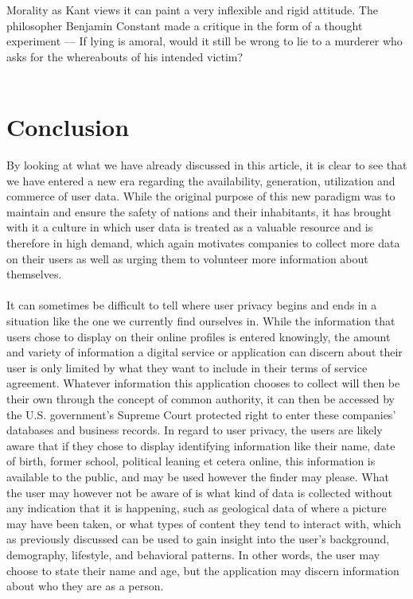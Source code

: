 \documentclass[11pt]{article}
\begin{document}
Morality as Kant views it can paint a very inflexible and rigid attitude. The philosopher Benjamin Constant made a critique in the form of a thought experiment --- If lying is amoral, would it still be wrong to lie to a murderer who asks for the whereabouts of his intended victim? 
\\ \\

\section{Conclusion}
By looking at what we have already discussed in this article, it is clear to see that we have entered a new era regarding the availability, generation, utilization and commerce of user data. While the original purpose of this new paradigm was to maintain and ensure the safety of nations and their inhabitants, it has brought with it a culture in which user data is treated as a valuable resource and is therefore in high demand, which again motivates companies to collect more data on their users as well as urging them to volunteer more information about themselves.
\\ \\
It can sometimes be difficult to tell where user privacy begins and ends in a situation like the one we currently find ourselves in. While the information that users chose to display on their online profiles is entered knowingly, the amount and variety of information a digital service or application can discern about their user is only limited by what they want to include in their terms of service agreement. Whatever information this application chooses to collect will then be their own through the concept of common authority, it can then be accessed by the U.S. government’s Supreme Court protected right to enter these companies’ databases and business records. In regard to user privacy, the users are likely aware that if they chose to display identifying information like their name, date of birth, former school, political leaning et cetera online, this information is available to the public, and may be used however the finder may please. What the user may however not be aware of is what kind of data is collected without any indication that it is happening, such as geological data of where a picture may have been taken, or what types of content they tend to interact with, which as previously discussed can be used to gain insight into the user’s background, demography, lifestyle, and behavioral patterns. In other words, the user may choose to state their name and age, but the application may discern information about who they are as a person.
\end{document}
